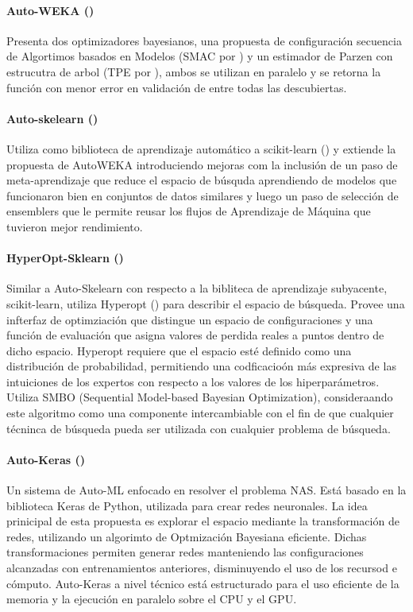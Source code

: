 \paragraph{Auto-WEKA (\cite{thornton2013auto})} Presenta dos optimizadores bayesianos, una propuesta de configuraci\'on secuencia de Algortimos basados en Modelos (SMAC por \cite{hutter2011sequential}) y un estimador de Parzen con estrucutra de arbol (TPE por \cite{bergstra2011algorithms}), ambos se utilizan en paralelo y se retorna la funci\'on con menor error en validaci\'on de entre todas las descubiertas.

\paragraph*{Auto-skelearn (\cite{feurer2015efficient})} Utiliza como biblioteca de aprendizaje autom\'atico a scikit-learn (\cite{pedregosa2011scikit}) y extiende la propuesta de AutoWEKA  introduciendo mejoras com la inclusi\'on de un paso de meta-aprendizaje que reduce el espacio de b\'usquda aprendiendo de modelos que funcionaron bien en conjuntos de datos similares y luego un paso de selecci\'on de ensemblers que le permite reusar los flujos de Aprendizaje de M\'aquina que tuvieron mejor rendimiento. 

\paragraph*{HyperOpt-Sklearn (\cite{komer2014hyperopt})} Similar a Auto-Skelearn con respecto a la bibliteca de aprendizaje subyacente, scikit-learn, utiliza Hyperopt (\cite{bergstra2013hyperopt}) para describir el espacio de b\'usqueda. Provee una infterfaz de optimziaci\'on que distingue un espacio de configuraciones y una funci\'on de evaluaci\'on que asigna valores de perdida reales a puntos dentro de dicho espacio. Hyperopt requiere que el espacio est\'e definido como una distribuci\'on de probabilidad, permitiendo una codficacio\'on m\'as expresiva de las intuiciones de los expertos con respecto a los valores de los hiperpar\'ametros. Utiliza SMBO (Sequential Model-based Bayesian Optimization), consideraando este algoritmo como una componente intercambiable con el fin de que cualquier t\'ecninca de b\'usqueda pueda ser utilizada con cualquier problema de b\'usqueda.

      \paragraph*{Auto-Keras (\cite{jin2018efficient})} Un sistema de Auto-ML enfocado en resolver el problema NAS. Est\'a basado en la biblioteca Keras de Python, utilizada para crear redes neuronales.  La idea prinicipal de esta propuesta es explorar el espacio mediante la transformaci\'on de redes, utilizando un algorimto de Optmizaci\'on Bayesiana eficiente. Dichas transformaciones permiten generar redes manteniendo las configuraciones alcanzadas con entrenamientos anteriores, disminuyendo el uso de los recursod e c\'omputo. Auto-Keras a nivel t\'ecnico est\'a estructurado para el uso eficiente de la memoria y la ejecuci\'on en paralelo sobre el CPU y el GPU.

